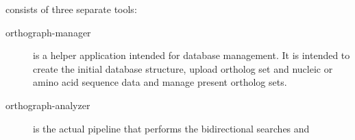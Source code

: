 \pname consists of three separate tools:

\begin{description}
	\item[orthograph-manager] is a helper application intended for database
		management. It is intended to create the initial database structure, upload
		ortholog set and nucleic or amino acid sequence data and manage present
		ortholog sets.
	\item[orthograph-analyzer] is the actual pipeline that performs the
		bidirectional searches and 
\end{description}
